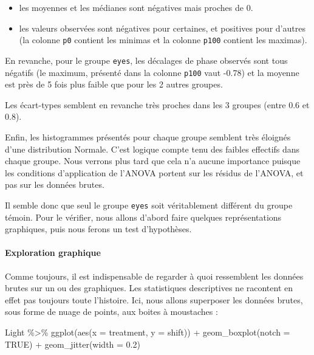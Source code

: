 \documentclass[
  a4paper,
]{article}
\newenvironment{Shaded}{\begin{snugshade}}{\end{snugshade}}
\newcommand{\AttributeTok}[1]{\textcolor[rgb]{0.00,0.34,0.68}{#1}}
\newcommand{\ConstantTok}[1]{\textcolor[rgb]{0.67,0.33,0.00}{#1}}
\newcommand{\FloatTok}[1]{\textcolor[rgb]{0.69,0.50,0.00}{#1}}
\newcommand{\FunctionTok}[1]{\textcolor[rgb]{0.39,0.29,0.61}{#1}}
\newcommand{\NormalTok}[1]{\textcolor[rgb]{0.12,0.11,0.11}{#1}}
\newcommand{\SpecialCharTok}[1]{\textcolor[rgb]{0.24,0.68,0.91}{#1}}
\providecommand{\tightlist}{%
  \setlength{\itemsep}{0pt}\setlength{\parskip}{0pt}}
\begin{document}
\begin{itemize}
\tightlist
\item
  les moyennes et les médianes sont négatives mais proches de 0.
\item
  les valeurs observées sont négatives pour certaines, et positives pour d'autres (la colonne \texttt{p0} contient les minimas et la colonne \texttt{p100} contient les maximas).
\end{itemize}

En revanche, pour le groupe \texttt{eyes}, les décalages de phase observés sont tous négatifs (le maximum, présenté dans la colonne \texttt{p100} vaut -0.78) et la moyenne est près de 5 fois plus faible que pour les 2 autres groupes.

Les écart-types semblent en revanche très proches dans les 3 groupes (entre 0.6 et 0.8).

Enfin, les histogrammes présentés pour chaque groupe semblent très éloignés d'une distribution Normale. C'est logique compte tenu des faibles effectifs dans chaque groupe. Nous verrons plus tard que cela n'a aucune importance puisque les conditions d'application de l'ANOVA portent sur les résidus de l'ANOVA, et pas sur les données brutes.

Il semble donc que seul le groupe \texttt{eyes} soit véritablement différent du groupe témoin. Pour le vérifier, nous allons d'abord faire quelques représentations graphiques, puis nous ferons un test d'hypothèses.

\hypertarget{exploration-graphique-3}{%
\paragraph{Exploration graphique}\label{exploration-graphique-3}}

Comme toujours, il est indispensable de regarder à quoi ressemblent les données brutes sur un ou des graphiques. Les statistiques descriptives ne racontent en effet pas toujours toute l'histoire. Ici, nous allons superposer les données brutes, sous forme de nuage de points, aux boites à moustaches :

\begin{Shaded}
\begin{Highlighting}[]
\NormalTok{Light }\SpecialCharTok{\%\textgreater{}\%} 
  \FunctionTok{ggplot}\NormalTok{(}\FunctionTok{aes}\NormalTok{(}\AttributeTok{x =}\NormalTok{ treatment, }\AttributeTok{y =}\NormalTok{ shift)) }\SpecialCharTok{+}
  \FunctionTok{geom\_boxplot}\NormalTok{(}\AttributeTok{notch =} \ConstantTok{TRUE}\NormalTok{) }\SpecialCharTok{+}
  \FunctionTok{geom\_jitter}\NormalTok{(}\AttributeTok{width =} \FloatTok{0.2}\NormalTok{)}
\end{Highlighting}
\end{Shaded}
\end{document}
